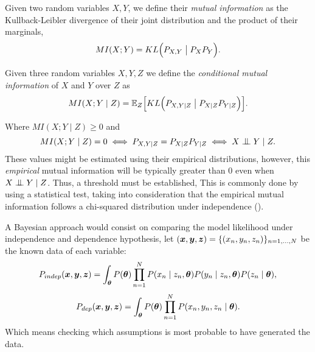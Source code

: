 \begin{definition}
  Given two random variables \(X, Y\), we define their \emph{mutual information} as the Kullback-Leibler divergence of their joint distribution and the product of their marginals,
  \[
    MI(X;Y) = KL\Big(P_{X,Y} \bigm| P_{X}P_{Y}\Big).
  \]
\end{definition}

\begin{definition}
  Given three random variables \(X, Y, Z\) we define the \emph{conditional mutual information} of \(X\) and \(Y\) over \(Z\) as
  \[
    MI(X;Y\mid Z) = \mathbb{E}_{Z}\Big[KL\Big(P_{X,Y \mid Z} \bigm| P_{X\mid Z} P_{Y \mid Z}\Big)\Big].
  \]
\end{definition}
Where \(MI(X;Y \mid Z) \geq 0\) and
\[
MI(X;Y \mid Z) = 0 \iff P_{X,Y \mid Z} = P_{X\mid Z} P_{Y \mid Z} \iff X\bigCI Y \mid Z.
\]
These values might be estimated using their empirical distributions, however, this \emph{empirical} mutual information will be typically greater than \(0\) even when \(X\bigCI Y \mid Z\). Thus, a threshold must be established, This is commonly done by using a statistical test, taking into consideration that the empirical mutual information follows a chi-squared distribution under independence (\cite{kullback1997information}).

A Bayesian approach would consist on comparing the model likelihood under independence and dependence hypothesis, let \((\bm{x}, \bm{y}, \bm{z}) = \{(x_{n}, y_{n}, z_{n})\}_{n=1,\dots, N}\) be the known data of each variable:
\[
  P_{indep}(\bm{x},\bm{y},\bm{z}) = \int_{\bm{\theta}} P(\bm{\theta}) \prod_{n=1}^{N} P(x_{n}\mid z_{n}, \bm{\theta})P(y_{n} \mid z_{n}, \bm{\theta})P(z_{n} \mid \bm{\theta}),
\]
\[
P_{dep}(\bm{x}, \bm{y}, \bm{z}) = \int_{\bm{\theta}} P(\bm{\theta}) \prod_{n=1}^{N}P(x_{n}, y_{n}, z_{n} \mid \bm{\theta}).
\]
Which means checking which assumptions is most probable to have generated the data.

